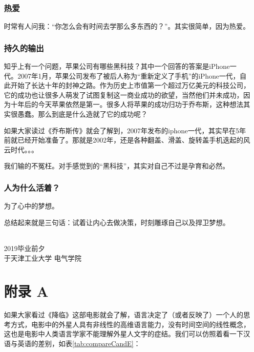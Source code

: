 \documentclass[UTF8,oneside]{ctexbook}
\begin{document}
\subsection*{热爱}
时常有人问我：“你怎么会有时间去学那么多东西的？”。其实很简单，因为热爱。

\subsection*{持久的输出}
知乎上有一个问题，苹果公司有哪些黑科技？其中一个回答的答案是iPhone一代。2007年1月，苹果公司发布了被后人称为“重新定义了手机”的iPhone一代，自此开始了长达十年的封神之路。作为历史上市值第一个超过万亿美元的科技公司，它的成功也让很多人萌发了试图复制这一商业成功的欲望，当然他们并未成功，因为十年后的今天苹果依然是第一。很多人将苹果的成功归功于乔布斯，这种想法其实很愚蠢。那么到底是什么造就了它的成功呢？

如果大家读过《乔布斯传》就会了解到，2007年发布的iphone一代，其实早在5年前就已经开始准备了。那就是2002年，还是各种翻盖、滑盖、旋转盖手机迭起的风云时代。。。

我们输的不冤枉。对手感觉到的“黑科技”，其实对自己不过是孕育和必然。

\subsection*{人为什么活着？}
为了心中的梦想。

\vspace{2cm}
总结起来就是三句话：试着让内心去做决策，时刻雕琢自己以及捍卫梦想。

\hspace{4cm}\\
\noindent2019毕业前夕\\
于天津工业大学 \quad 电气学院







\chapter*{附录 A}\label{fuluA}
如果大家看过《降临》这部电影就会了解，语言决定了（或者反映了）一个人的思考方式，电影中的外星人具有非线性的高维语言能力，没有时间空间的线性概念，这也是电影中人类语言学家不能理解外星人文字的症结。我们可以仿照着看一下汉语与英语的差别，如表\ref{tab:compareCandE}：
\end{document}
